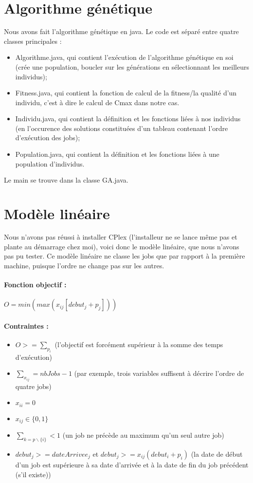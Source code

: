 \documentclass[11pt]{article} %
\begin{document}
\section{Algorithme génétique}
Nous avons fait l'algorithme génétique en java. Le code est séparé entre quatre classes principales : 
\begin{itemize}
	\item Algorithme.java, qui contient l'exécution de l'algorithme génétique en soi (crée une population, boucler sur les générations en sélectionnant les meilleurs individus);
	\item Fitness.java, qui contient la fonction de calcul de la fitness/la qualité d'un individu, c'est à dire le calcul de Cmax dans notre cas.
	\item Individu.java, qui contient la définition et les fonctions liées à nos individus (en l'occurence des solutions constituées d'un tableau contenant l'ordre d'exécution des jobs);
	\item Population.java, qui contient la définition et les fonctions liées à une population d'individus.\\
\end{itemize}

Le main se trouve dans la classe GA.java.

\section{Modèle linéaire}

Nous n'avons pas réussi à installer CPlex (l'installeur ne se lance même pas et plante au démarrage chez moi), voici donc le modèle linéaire, que nous n'avons pas pu tester.
Ce modèle linéaire ne classe les jobs que par rapport à la première machine, puisque l'ordre ne change pas sur les autres.\\

\paragraph{Fonction objectif :} $O = min(max(x_{ij}[debut_j+p_j]))$

\paragraph{Contraintes :}
\begin{itemize}
	\item $O >= \sum_{p_i}$ (l'objectif est forcément supérieur à la somme des temps d'exécution)
	\item $\sum_{x_{ij}} = nbJobs-1$ (par exemple, trois variables suffisent à décrire l'ordre de quatre jobs)
	\item $x_{ii} = 0$
	\item $x_{ij} \in \{0, 1\}$
	\item $\sum_{k=p\backslash\{i\}} < 1$ (un job ne précède au maximum qu'un seul autre job)
	\item $debut_j >= dateArrivee_j$ et $debut_j >= x_{ij}(debut_i+p_i)$ (la date de début d'un job est supérieure à sa date d'arrivée et à la date de fin du job précédent (s'il existe))
\end{itemize}
\end{document}

